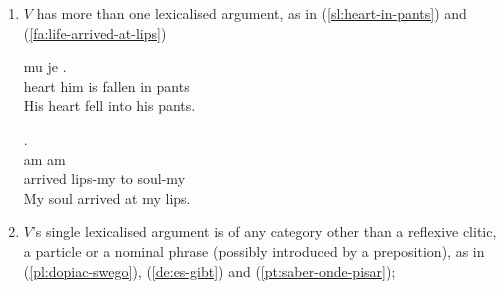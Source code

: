 \documentclass[output=paper,modfonts]{langscibook}
\begin{document}
\begin{enumerate}
\item\label{many-lex-arg} $V$ has more than one lexicalised argument, as in (\ref{sl:heart-in-pants}) and (\ref{fa:life-arrived-at-lips})


\ea \label{sl:heart-in-pants}
\settowidth {}
\gll {} mu je   . \\
heart him is fallen in pants\\ 
\glt His heart fell into his pants. 
\z

\ea \label{fa:life-arrived-at-lips}
\settowidth {}
\glll . \underline{}  \underline{}  \underline{} \\
 am  am\\
arrived lips-my to soul-my\\ 
\glt My soul arrived at my lips. 
\z



\item $V$'s single lexicalised argument is of any category other than a reflexive clitic, a particle or a nominal phrase (possibly introduced by a preposition), as in (\ref{pl:dopiac-swego}), (\ref{de:es-gibt}) and (\ref{pt:saber-onde-pisar});



\end{enumerate}
\end{document}
